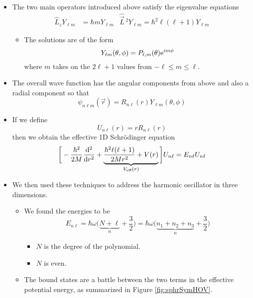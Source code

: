 \documentclass[../notes.tex]{subfiles}
\begin{document}
\begin{itemize}
    \item The two main operators introduced above satisfy the eigenvalue equations
    \begin{align*}
        \hat{L}_zY_{\ell m} &= \hbar mY_{\ell m}&
        \hat{\vec{L}}{\,}^2Y_{\ell m} = \hbar^2\ell(\ell+1)Y_{\ell m}
    \end{align*}
    \begin{itemize}
        \item The solutions are of the form
        \begin{equation*}
            Y_{\ell m}(\theta,\phi) = P_{\ell,m}(\theta)\e[im\phi]
        \end{equation*}
        where $m$ takes on the $2\ell+1$ values from $-\ell\leq m\leq\ell$.
    \end{itemize}
    \item The overall wave function has the angular components from above and also a radial component so that
    \begin{equation*}
        \psi_{n\ell m}(\vec{r}) = R_{n\ell}(r)Y_{\ell m}(\theta,\phi)
    \end{equation*}
    \item If we define
    \begin{equation*}
        U_{n\ell}(r) = rR_{n\ell}(r)
    \end{equation*}
    then we obtain the effective 1D Schr\"{o}dinger equation
    \begin{equation*}
        \bigg[ -\frac{\hbar^2}{2M}\dv[2]{r}+\underbrace{\frac{\hbar^2\ell(\ell+1)}{2Mr^2}+V(r)}_{V_\text{eff}(r)} \bigg]U_{n\ell} = E_{n\ell}U_{n\ell}
    \end{equation*}
    \item We then used these techniques to address the harmonic oscillator in three dimensions.
    \begin{itemize}
        \item We found the energies to be
        \begin{equation*}
            E_{n\ell} = \hbar\omega\bigg( \underbrace{N+\ell}_n+\frac{3}{2} \bigg)
            = \hbar\omega\bigg( \underbrace{n_1+n_2+n_3}_n+\frac{3}{2} \bigg)
        \end{equation*}
        \begin{itemize}
            \item $N$ is the degree of the polynomial.
            \item $N$ is even.
        \end{itemize}
        \item The bound states are a battle between the two terms in the effective potential energy, as summarized in Figure \ref{fig:sphrSymHOV}.

\end{itemize}
\end{itemize}
\end{document}
